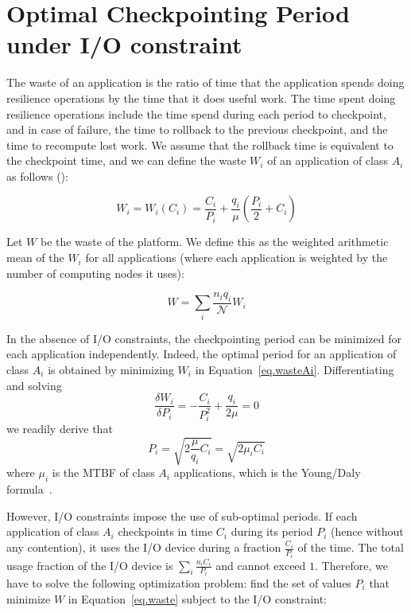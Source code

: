 \documentclass{article}
\newcommand{\nbnodesplat}{{\mathcal N}}
\newcommand{\app}[1]{A_{#1}}
\newcommand{\nbapp}[1]{n_{#1}}
\newcommand{\nbnodes}[1]{q_{#1}}
\newcommand{\period}[1]{P_{#1}}
\newcommand{\ckpt}[1]{C_{#1}}
\newcommand{\wasteapp}[1]{W_{#1}}
\newcommand{\mtbfplat}{\mu}
\newcommand{\wasteplat}{W}
\newcommand{\wastefct}[2]{W_{#1}(#2)}
\begin{document}
\section{Optimal Checkpointing Period under I/O constraint}
\label{sec.optimal}

The waste of an application is the ratio of time that the application spends doing
resilience operations by the time that it does useful work. The time
spent doing resilience operations include the time spend during each period to checkpoint, and in case of failure, the time to rollback to the previous checkpoint, and the time to recompute lost work. We assume
that the rollback time is equivalent to the checkpoint time, and we
can define the waste $\wasteapp{i}$ of an application of class
$\app{i}$ as follows (\cite{springer-monograph}):

\begin{equation}
\wasteapp{i} = \wastefct{i}{\ckpt{i}} = \frac{\ckpt{i}}{\period{i}} +
\frac{\nbnodes{i}}{\mtbfplat}(\frac{\period{i}}{2} + \ckpt{i})
\label{eq.wasteAi}
\end{equation}

Let $\wasteplat$ be the waste of the platform. We define this as the
weighted arithmetic mean of the $\wasteapp{i}$ for all applications
(where each application is weighted by the number of computing nodes
it uses):

\begin{equation}
\wasteplat = \sum_i \frac{\nbapp{i} \nbnodes{i}}{\nbnodesplat} \wasteapp{i}
\label{eq.waste}
\end{equation}

In the absence of I/O constraints, the checkpointing period can be minimized
for each application independently. Indeed, the optimal period for an application  
of class $\app{i}$ is obtained by minimizing $\wasteapp{i}$ in Equation~\eqref{eq.wasteAi}.
Differentiating and solving 
$$\frac{\delta \wasteapp{i}}{\delta \period{i}} = - \frac{\ckpt{i}}{\period{i}^{2}} + \frac{\nbnodes{i}}{2 \mtbfplat} = 0$$
we readily derive that
\begin{equation}
\period{i} = \sqrt{2 \frac{\mtbfplat}{\nbnodes{i}} \ckpt{i}} = \sqrt{2 \mu_{i} \ckpt{i}}
\label{eq.daly}
\end{equation}
where $\mu_{i}$ is the MTBF of  class $\app{i}$ applications, which is the Young/Daly formula~\cite{young74,daly04}.

However, I/O constraints impose the use of sub-optimal periods. If each application
of  class $\app{i}$ checkpoints in time $\ckpt{i}$ during its period $\period{i}$ (hence without any contention), it uses the I/O device during a fraction $\frac{\ckpt{i}}{\period{i}}$ of the time.
The total usage fraction of the  I/O device is $\sum_{i} \frac{\nbapp{i} \ckpt{i}}{\period{i}}$
and cannot exceed $1$. Therefore, we have to solve the following optimization problem: find
the set of values $\period{i}$ that minimize $\wasteplat$ in Equation~\eqref{eq.waste} subject to the I/O constraint:
\end{document}
